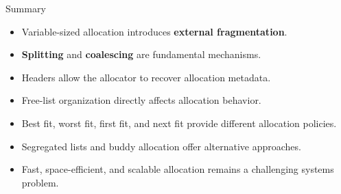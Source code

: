 \begin{frame}{Summary}

\begin{itemize}
    \item Variable-sized allocation introduces \textbf{external fragmentation}.
    \item \textbf{Splitting} and \textbf{coalescing} are fundamental mechanisms.
    \item Headers allow the allocator to recover allocation metadata.
    \item Free-list organization directly affects allocation behavior.
    \item Best fit, worst fit, first fit, and next fit provide different
          allocation policies.
    \item Segregated lists and buddy allocation offer alternative approaches.
    \item Fast, space-efficient, and scalable allocation remains a challenging
          systems problem.
\end{itemize}

\end{frame}
